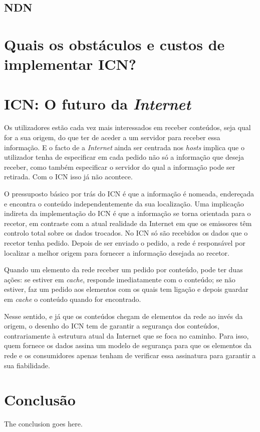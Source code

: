 \documentclass[conference]{IEEEtran}
\begin{document}
\subsection{NDN}

\section{Quais os obst\'{a}culos e custos de implementar ICN?}



\section{ICN: O futuro da \textit{Internet}}

Os utilizadores est\~{a}o cada vez mais interessados em receber conte\'{u}dos, seja qual for a sua origem, do que ter de aceder a um servidor para receber essa informa\c{c}\~{a}o. E o facto de a \textit{Internet} ainda ser centrada nos \textit{hosts} implica que o utilizador tenha de especificar em cada pedido n\~{a}o s\'{o} a informa\c{c}\~{a}o que deseja receber, como tamb\'{e}m especificar o servidor do qual a informa\c{c}\~{a}o pode ser retirada. Com o ICN isso j\'{a} n\~{a}o acontece\cite{surveyICN}.

O pressuposto b\'{a}sico por tr\'{a}s do ICN \'{e} que a informa\c{c}\~{a}o \'{e} nomeada, endere\c{c}ada e encontra o conte\'{u}do independentemente da sua localiza\c{c}\~{a}o. Uma implica\c{c}\~{a}o indireta da implementa\c{c}\~{a}o do ICN \'{e} que a informa\c{c}\~{a}o se torna orientada para o recetor, em contraste com a atual realidade da Internet em que os emissores t\^{e}m controlo total sobre os dados trocados\cite{publishSubscribe}. No ICN s\'{o} s\~{a}o recebidos os dados que o recetor tenha pedido. Depois de ser enviado o pedido, a rede \'{e} respons\'{a}vel por localizar a melhor origem para fornecer a informa\c{c}\~{a}o desejada ao recetor.

Quando um elemento da rede receber um pedido por conte\'{u}do, pode ter duas a\c{c}\~{o}es: se estiver em \textit{cache}, responde imediatamente com o conte\'{u}do; se n\~{a}o estiver, faz um pedido aos elementos com os quais tem liga\c{c}\~{a}o e depois guardar em \textit{cache} o conte\'{u}do quando for encontrado\cite{surveyICN}.

Nesse sentido, e j\'{a} que os conte\'{u}dos chegam de elementos da rede ao inv\'{e}s da origem, o desenho do ICN tem de garantir a seguran\c{c}a dos conte\'{u}dos, contrariamente \`{a} estrutura atual da Internet que se foca no caminho. Para isso, quem fornece os dados assina um modelo de seguran\c{c}a para que os elementos da rede e os consumidores apenas tenham de verificar essa assinatura para garantir a sua fiabilidade\cite{icnForest}.


\section{Conclus\~{a}o}
The conclusion goes here.

\IEEEtriggercmd{\enlargethispage{-5in}}



\end{document}
